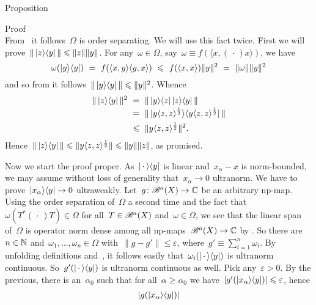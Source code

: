 \documentclass[b]{subfiles}
\begin{document}
\begin{parsec}
\begin{point}{Proposition}
\begin{point}{Proof}
\begin{equation*}
\end{equation*}
From~
    it follows~$\Omega$ is order separating.
We will use this fact twice.
First we will prove~$\| \left|z\right>\!\left<y\right| \| \leqslant \| z\| \|y\|$.
For any~$\omega \in \Omega$,
    say~$\omega \equiv f(\langle x,(\,\cdot\,) x \rangle)$, we have
\begin{equation*}
    \omega(\left|y\right>\!\left<y\right|)
     \ = \ f(\langle x,y \rangle\langle y, x \rangle) 
     \ \leqslant \ f(\langle x, x\rangle) \| y\|^2 
     \ = \ \| \omega \| \| y\|^2
\end{equation*}
and so from  it follows~$\| \left|y\right>\!\left<y\right| \| \leqslant \|y\|^2$. Whence
\begin{align*}
    \| \left|z\right>\!\left<y\right| \|^2
        & \ = \ \| \left|y\right>\!\left<z\right| \left|z\right>\!\left<y\right| \| \\
        & \ = \ \| \left|\smash{y \langle z,z\rangle^{\frac{1}{2}}}\right>\!\left<
\smash{y \langle z,z\rangle^{\frac{1}{2}}}\right| \| \\
        & \ \leqslant \ \| y \langle z,z \rangle^{\frac{1}{2}} \|^2.
\end{align*}
Hence~$\| \left|z\right>\!\left<y\right| \| \leqslant \|y \langle z,z\rangle^{\frac{1}{2}} \|
                            \leqslant \|y\|  \|z\|$, as promised.
\begin{point}%
Now we start the proof proper.
As~$\left|\,\cdot\,\right>\!\left<y\right|$ is linear
    and~$x_\alpha - x$ is norm-bounded,
    we may assume without loss of generality
    that~$x_\alpha \to 0$ ultranorm.
    We have to prove~$\left|x_\alpha\right>\!\left<y\right| \to 0$ ultraweakly.
Let~$g\colon \mathscr{B}^a(X) \to \mathbb{C}$ be an arbitrary np-map.
Using the order separation of~$\Omega$ a second time
        and the fact that~$\omega(T^* (\,\cdot\,)T) \in \Omega$
        for all~$T \in \mathscr{B}^a(X)$ and~$\omega \in \Omega$,
        we see that the linear span of~$\Omega$
    is operator norm dense among  all np-maps~$\mathscr{B}^a(X) \to \mathbb{C}$
    by .
So there are~$n \in \mathbb{N}$ and~$\omega_1, \ldots, \omega_n \in \Omega$
    with~$\| g - g' \| \leq \varepsilon$,
    where~$g' \equiv \sum^n_{i=1} \omega_i$.
By unfolding definitions and~,
    it follows easily that~$\omega_i(\left|\,\cdot\,\right>\!\left<y\right|)$
    is ultranorm continuous.
    So~$g'(\left|\,\cdot\,\right>\!\left<y\right|)$ is ultranorm continuous as well.
Pick any~$\varepsilon > 0$.
By the previous,
    there is an~$\alpha_0$ such that for all~$\alpha \geq \alpha_0$
    we have~$|g'(\left|x_\alpha\right>\!\left<y\right|)| \leqslant \varepsilon$,
    hence
\begin{align*}
        | g(\ketbra{x_\alpha}{y}) |

\end{align*}
\end{point}
\end{point}
\end{point}
\end{parsec}
\end{document}
